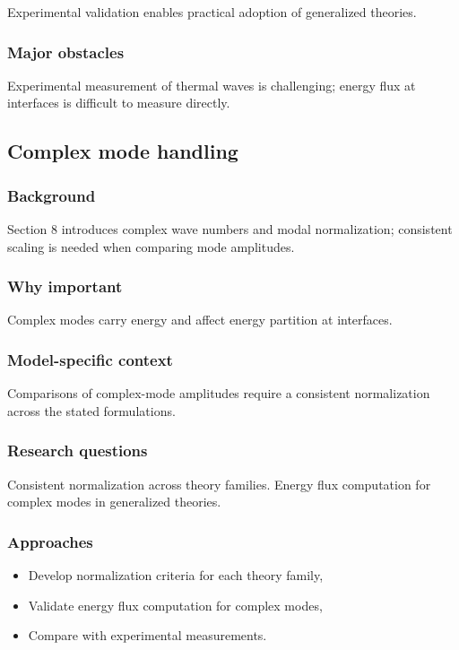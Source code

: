 Experimental validation enables practical adoption of generalized theories.

\subsubsection{Major obstacles}

Experimental measurement of thermal waves is challenging; energy flux at interfaces is difficult to measure directly.

\subsection{Complex mode handling}
\label{sec:15.5}

\subsubsection{Background}

Section 8 introduces complex wave numbers and modal normalization; consistent scaling is needed when comparing mode amplitudes.

\subsubsection{Why important}

Complex modes carry energy and affect energy partition at interfaces.

\subsubsection{Model-specific context}

Comparisons of complex-mode amplitudes require a consistent normalization across the stated formulations.

\subsubsection{Research questions}

Consistent normalization across theory families. Energy flux computation for complex modes in generalized theories.

\subsubsection{Approaches}

\begin{itemize}
\item Develop normalization criteria for each theory family,
\item Validate energy flux computation for complex modes,
\item Compare with experimental measurements.
\end{itemize}

